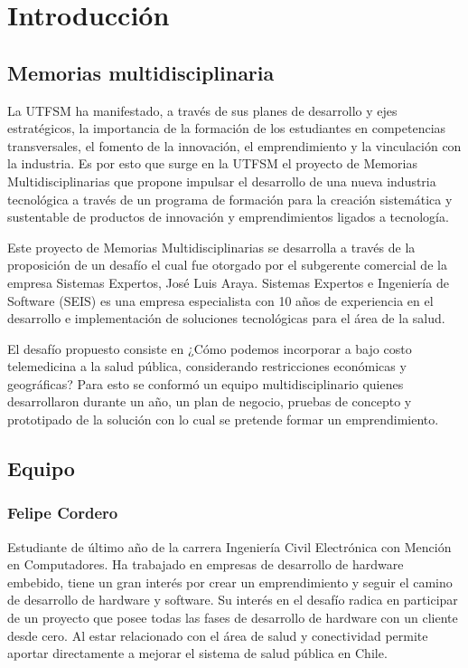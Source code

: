 \chapter{Introducción}\label{intro}

\section{Memorias multidisciplinaria}
La UTFSM ha manifestado, a través de sus planes de desarrollo y ejes estratégicos, la importancia de la formación de los estudiantes en competencias transversales, el fomento de la innovación, el emprendimiento y la vinculación con la industria. Es por esto que surge en la UTFSM el proyecto de Memorias Multidisciplinarias que propone impulsar el desarrollo de una nueva industria tecnológica a través de un programa de formación para la creación sistemática y sustentable de productos de innovación y emprendimientos ligados a tecnología.

Este proyecto de Memorias Multidisciplinarias se desarrolla a través de la proposición de un desafío el cual fue otorgado por el subgerente comercial de la empresa Sistemas Expertos, José Luis Araya. Sistemas Expertos e Ingeniería de Software (SEIS) es una empresa especialista con 10 años de experiencia en el desarrollo e implementación de soluciones tecnológicas para el área de la salud.

El desafío propuesto consiste en ¿Cómo podemos incorporar a bajo costo telemedicina a la salud pública, considerando restricciones económicas y geográficas? Para esto se conformó un equipo multidisciplinario quienes desarrollaron durante un año, un plan de negocio, pruebas de concepto y prototipado de la solución con lo cual se pretende formar un emprendimiento. 



\newpage
\section{Equipo}

\subsection{Felipe Cordero}
Estudiante de último año de la carrera Ingeniería Civil Electrónica con Mención en Computadores. Ha trabajado en empresas de desarrollo de hardware embebido, tiene un gran interés por crear un emprendimiento y seguir el camino de desarrollo de hardware y software. Su interés en el desafío radica en participar de un proyecto que posee todas las fases de desarrollo de hardware con un cliente desde cero. Al estar relacionado con el área de salud y conectividad  permite aportar directamente a mejorar el sistema de salud pública en Chile. 

